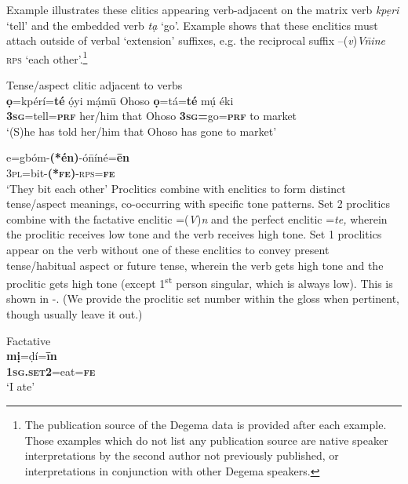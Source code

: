 \documentclass[output=paper]{langsci/langscibook}
\begin{document}
Example  illustrates these clitics appearing verb-adjacent on the matrix verb \textit{kpẹri} ‘tell’ and the embedded verb \textit{tạ} ‘go’. Example  shows that these enclitics must attach outside of verbal ‘extension’ suffixes, e.g. the reciprocal suffix –(\textit{v})\textit{V\={n}ine} \textsc{rps} ‘each other’.\footnote{The publication source of the Degema data is provided after each example. Those examples which do not list any publication source are native speaker interpretations by the second author not previously published, or interpretations in conjunction with other Degema speakers. 
}


\ea
{Tense/aspect clitic adjacent to verbs}\\
   \ea\label{ex:rolle:1}
\gll   \textbf{ọ}=kpérí=\textbf{té}   ọ́yi     mạ́mū   Ohoso   \textbf{ọ}=tá=\textbf{té}     mụ́  éki\\
      \textbf{3}\textbf{\textsc{sg}}=tell=\textbf{\textsc{prf}}   her/him  that     Ohoso  \textbf{3}\textbf{\textsc{sg}}\textbf{=}go=\textbf{\textsc{prf}}  to  market\\
\glt   ‘(S)he has told her/him that Ohoso has gone to market’ \citep[63]{Kari2004}

\ex\label{ex:rolle:2}
\gll   e=gbóm-\textbf{(*én)}{}-ó\={n}íné=\textbf{ēn}\\
       3\textsc{pl}=bit-\textbf{(*}\textbf{\textsc{fe}}\textbf{)}{}-\textsc{rps}=\textbf{\textsc{fe}}\\
\glt   ‘They bit each other’ \citep[149]{Kari2004}
\z
\z 
Proclitics combine with enclitics to form distinct tense/aspect meanings, co-occurring with specific tone patterns. Set 2 proclitics combine with the factative enclitic =(\textit{V})\textit{n} and the perfect enclitic =\textit{te,} wherein the proclitic receives low tone and the verb receives high tone. Set 1 proclitics appear on the verb without one of these enclitics to convey present tense/habitual aspect or future tense, wherein the verb gets high tone and the proclitic gets high tone (except 1\textsuperscript{st} person singular, which is always low). This is shown in -. (We provide the proclitic set number within the gloss when pertinent, though usually leave it out.)


\ea\label{ex:rolle:3}
Factative\\
\gll  \textbf{mị}=ḍí=\textbf{īn}\\
     \textbf{\textsc{1sg.set2}}=eat=\textbf{\textsc{fe}}\\
\glt ‘I ate’ \citep[44]{Kari1997}
\z
\end{document}
